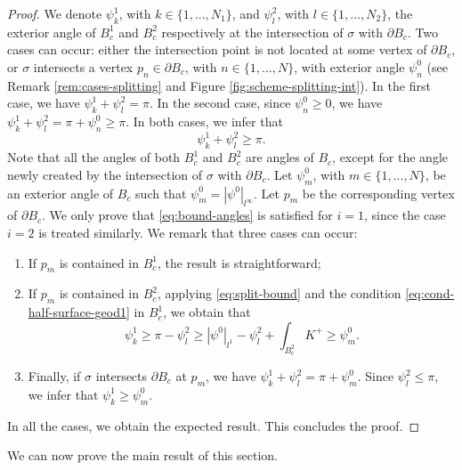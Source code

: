 \documentclass{article}
\newcommand{\halfP}{B}
\theoremstyle{remark}
\theoremstyle{prpart}
\begin{document}
\begin{proof}
  We denote $\psi_k^1$, with $k\in\{1,...,N_1\}$, and $\psi_l^2$, with $l\in\{1,...,N_2\}$, the exterior angle of $\halfP_c^1$ and $\halfP_c^2$ respectively at the intersection of $\sigma$ with $\partial \halfP_c$. Two cases can occur: either the intersection point is not located at some vertex of $\partial \halfP_c$, or $\sigma$ intersects a vertex $p_n\in\partial \halfP_c$, with $n\in\{1,...,N\}$, with exterior angle $\psi^0_n$ (see Remark \ref{rem:cases-splitting} and Figure \ref{fig:scheme-splitting-int}). In the first case, we have $\psi_k^1+\psi_l^2=\pi$. In the second case, since $\psi^0_n\geq 0$, we have $\psi_k^1+\psi_l^2=\pi+\psi^0_n\geq\pi$. In both cases, we infer that
  \begin{equation}\label{eq:split-bound}
    \psi_k^1+\psi_l^2\geq\pi.
  \end{equation}
  Note that all the angles of both $\halfP_c^1$ and $\halfP_c^2$ are angles of $\halfP_c$, except for the angle newly created by the intersection of $\sigma$ with $\partial \halfP_c$. Let $\psi^0_m$, with $m\in\{1,...,N\}$, be an exterior angle of $\halfP_c$ such that $\psi^0_m=|\psi^0|_{l^\infty}$. Let $p_m$ be the corresponding vertex of $\partial\halfP_c$. We only prove that \eqref{eq:bound-angles} is satisfied for $i=1$, since the case $i=2$ is treated similarly. We remark that three cases can occur:
  \begin{enumerate}%
  \item If $p_m$ is contained in $\halfP_c^1$, the result is straightforward;
  \item If $p_m$ is contained in $\halfP_c^2$, applying \eqref{eq:split-bound} and the condition \eqref{eq:cond-half-surface-geod1} in $\halfP_c^1$, we obtain that
    \begin{equation*}
      \psi_k^1\geq \pi-\psi_l^2 \geq |\psi^0|_{l^1} - \psi^2_l+\int_{\halfP_c^2}{K^+} \geq \psi^0_m.
    \end{equation*}
  \item Finally, if $\sigma$ intersects $\partial\halfP_c$ at $p_m$, we have $\psi_k^1+\psi_l^2=\pi+\psi^0_m$. Since $\psi_l^2\leq \pi$, we infer that $\psi_k^1\geq\psi^0_m$.
  \end{enumerate}
In all the cases, we obtain the expected result. This concludes the proof.
\end{proof}
We can now prove the main result of this section.
\end{document}
